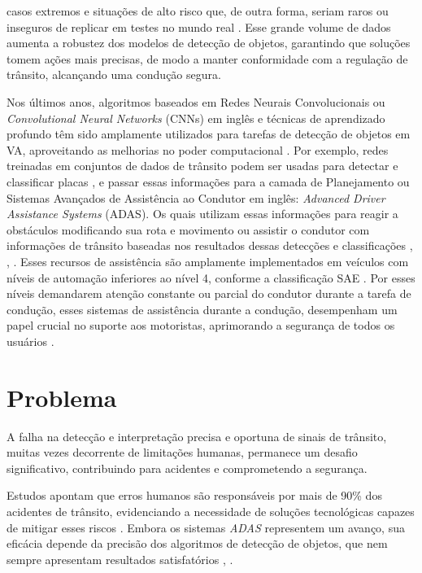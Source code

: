 \documentclass[
	12pt,				%
	oneside, %
	a4paper,			%
	english,			%
	french,				%
	spanish,			%
	brazil				%
	]{abntex2}
\begin{document}
casos extremos e situações de alto risco que, de outra forma, seriam raros ou inseguros de replicar em testes no mundo real \cite{wachenfeld_release_autonomous_vehicles}. Esse grande volume de dados aumenta a robustez dos modelos de detecção de objetos, garantindo que soluções tomem ações mais precisas, de modo a manter conformidade com a regulação de trânsito, alcançando uma condução segura.%

Nos últimos anos, algoritmos baseados em Redes Neurais Convolucionais ou \textit{Convolutional Neural Networks} (CNNs) em inglês e técnicas de aprendizado profundo têm sido amplamente utilizados para tarefas de detecção de objetos em VA, aproveitando as melhorias no poder computacional \cite[p. ~4]{s23167145}. Por exemplo, redes treinadas em conjuntos de dados de trânsito podem ser usadas para detectar e classificar %
placas \cite[p. ~6]{sensors-yet}, e passar essas informações para a camada de Planejamento ou Sistemas Avançados de Assistência ao Condutor em inglês:  \textit{Advanced Driver Assistance Systems} (ADAS). Os quais utilizam essas informações para reagir a obstáculos modificando sua rota e movimento ou assistir o condutor com
informações de trânsito 
baseadas nos resultados dessas detecções e classificações \cite[p. ~46]{ahire2024simulating}, \cite{okpono2024advanced}, \cite[p. ~4]{sensors-yet}. Esses recursos de assistência são amplamente implementados em veículos com níveis de automação inferiores ao nível 4, conforme a classificação SAE \cite{SAE}. Por esses níveis demandarem atenção constante ou parcial do condutor durante a tarefa de condução, esses sistemas de assistência durante a condução, desempenham um papel crucial no suporte aos motoristas, aprimorando a segurança de todos os usuários \cite{okpono2024advanced}.

\section{Problema}

A falha na detecção e interpretação precisa e oportuna de sinais de trânsito, muitas vezes decorrente de limitações humanas, permanece um desafio significativo, contribuindo para acidentes e comprometendo a segurança. 

Estudos apontam que erros humanos são responsáveis por mais de 90\% dos acidentes de trânsito, evidenciando a necessidade de soluções tecnológicas capazes de mitigar esses riscos \cite{nhtsa_crash_causation}. Embora os sistemas \textit{ADAS} representem um avanço, sua eficácia depende da precisão dos algoritmos de detecção de objetos, que nem sempre apresentam resultados satisfatórios \cite{ahire2024simulating}, \cite{sensors-yet}.
\end{document}
